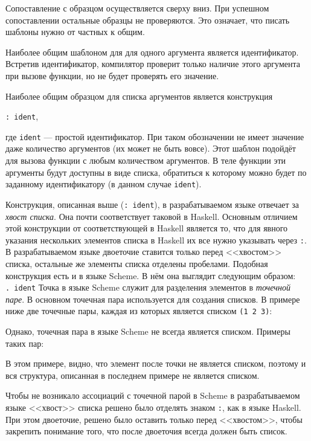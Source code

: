         Сопоставление с образцом осуществляется сверху вниз.
        При успешном сопоставлении остальные образцы не проверяются.
        Это означает, что писать шаблоны нужно от частных к общим.

        Наиболее общим шаблоном для для одного аргумента является идентификатор.
        Встретив идентификатор, компилятор проверит только наличие этого аргумента при вызове функции, но не будет проверять его значение.

        Наиболее общим образцом для списка аргументов является конструкция

        \verb!: ident!,

        где \verb!ident! --- простой идентификатор.
        При таком обозначении не имеет значение даже количество аргументов (их может не быть вовсе).
        Этот шаблон подойдёт для вызова функции с любым количеством аргументов.
        В теле функции эти аргументы будут доступны в виде списка, обратиться к которому можно будет по заданному идентификатору (в данном случае \verb!ident!).

        Конструкция, описанная выше (\verb!: ident!), в разрабатываемом языке отвечает за \textit{хвост списка}.
        Она почти соответствует таковой в Haskell.
        Основным отличием этой конструкции от соответствующей в Haskell является то, что для явного указания нескольких элементов списка в Haskell их все нужно указывать через \verb!:!.
        В разрабатываемом языке двоеточие ставится только перед <<хвостом>> списка, остальные же элементы списка отделены пробелами.
        Подобная конструкция есть и в языке Scheme.
        В нём она выглядит следующим образом:
        \\ \verb!. ident!
        Точка в языке Scheme служит для разделения элементов в \textit{точечной паре}.
        В основном точечная пара используется для создания списков.
        В примере ниже две точечные пары, каждая из которых является списком \verb$(1 2 3)$:
        

        Однако, точечная пара в языке Scheme не всегда является списком.
        Примеры таких пар:
        

        В этом примере, видно, что элемент после точки не является списком, поэтому и вся структура, описанная в последнем примере не является списком.

        Чтобы не возникало ассоциаций с точечной парой в Scheme в разрабатываемом языке <<хвост>> списка решено было отделять знаком \verb,:,, как в языке Haskell.
        При этом двоеточие, решено было оставить только перед <<хвостом>>, чтобы закрепить понимание того, что после двоеточия всегда должен быть список.

